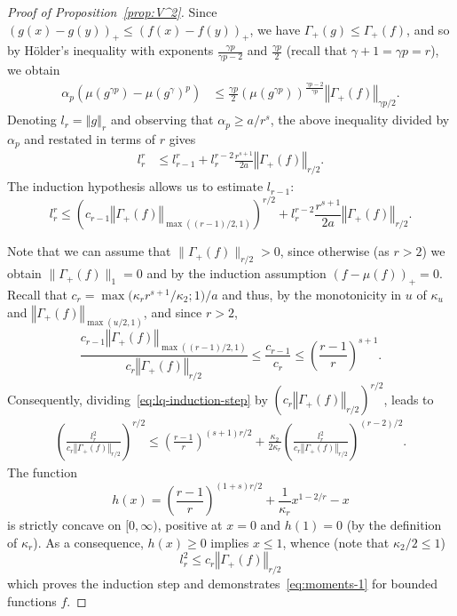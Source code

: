 \documentclass[a4paper]{amsart}
\theoremstyle{definition}
\theoremstyle{remark}
\numberwithin{equation}{section}
\newcommand*{\norm}[1]{\left\Vert #1 \right\Vert}
\begin{document}
\begin{proof}[Proof of Proposition~\ref{prop:V^2}]
 Since $(g(x)-g(y))_+\le (f(x)-f(y))_+$, we have $\Gamma_+(g)\le\Gamma_+(f)$, and so by H\"{o}lder's inequality with exponents $\frac{\gamma p}{\gamma p -2}$ and $\frac{\gamma p}{2}$ (recall that $\gamma + 1 = \gamma p=r$), we obtain
\begin{align}\label{eq:po-Holderze}
	\alpha_p (\mu (g^{\gamma p}) - \mu (g^{\gamma})^{p})
	&\le
	\frac{\gamma p}{2} ( \mu(g^{\gamma p}))^{\frac{\gamma p - 2}{\gamma p}}\norm{\Gamma_+(f)}_{\gamma p /2}.
\end{align}
 Denoting $l_r=\norm{g}_r$ and observing that $\alpha_p \ge a/r^s$, the above inequality divided by $\alpha_p$ and restated in terms of $r$ gives
\begin{align*}
	l_{r}^r &\le
	l_{r-1}^{r} +
	l_{r}^{r-2} \frac{r^{s+1}}{2a}\norm{\Gamma_+(f)}_{r/2}.
\end{align*}
 The induction hypothesis allows us to estimate $l_{r-1}$:
\begin{equation}\label{eq:lq-induction-step}
	l_{r}^r \le
	\left(c_{r-1}\norm{\Gamma_+(f)}_{\max((r-1)/2,1)}\right)^{r/2}
	+
	l_{r}^{r-2}\frac{r^{s+1}}{2a}\norm{\Gamma_+(f)}_{r/2}.
\end{equation}

Note that we can assume that $\|\Gamma_+(f)\|_{r/2} > 0$, since otherwise (as $r> 2$) we obtain $\|\Gamma_+(f)\|_{1} = 0$ and by the induction assumption $(f - \mu(f))_+ = 0$.
Recall that $c_r = \max\big(\kappa_rr^{s+1}/\kappa_2;1\big)/a$ and thus, by the monotonicity in $u$ of $\kappa_u$ and $\norm{\Gamma_+(f)}_{\max(u/2,1)}$, and since $r>2$,
\[
	\frac{c_{r-1}\norm{\Gamma_+(f)}_{\max((r-1)/2,1)}}{c_r\norm{\Gamma_+(f)}_{r/2}} \le
	\frac{c_{r-1}}{c_{r}} \le
	\left(\frac{r-1}{r}\right)^{s+1}.
\]
Consequently, dividing~\eqref{eq:lq-induction-step} by $(c_r\norm{\Gamma_+(f)}_{r/2})^{r/2}$, leads to
\begin{align}\label{eq:division}
	\left(\frac{l_r^2}{c_r\norm{\Gamma_+(f)}_{r/2}}\right)^{r/2}
	\le
	\left(\frac{r-1}{r}\right)^{(s+1)r/2}
	+
	\frac{\kappa_2}{2\kappa_r}\left(\frac{l_r^2}{c_r\norm{\Gamma_+(f)}_{r/2}}\right)^{(r-2)/2}.
\end{align}
The function
\[
	h(x) =
	\left(\frac{r-1}{r}\right)^{(1+s)r/2}
	+
	\frac{1}{\kappa_r} x^{1-2/r} - x
\]
is strictly concave on $[0,\infty)$, positive at $x=0$ and $h(1)=0$ (by the definition of $\kappa_r$).
As a consequence, $h(x)\geq 0$ implies $x\le 1$, whence (note that $\kappa_2/2\le 1$)
\[
	l_r^2
	\le
	c_r\norm{\Gamma_+(f)}_{r/2}
\]
which proves the induction step and demonstrates~\eqref{eq:moments-1} for bounded functions $f$.




\end{proof}
\end{document}
